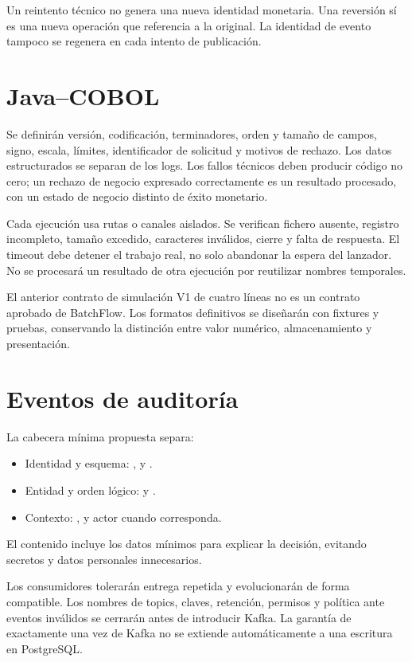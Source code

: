 Un reintento técnico no genera una nueva identidad monetaria. Una reversión sí es una nueva operación que referencia a la original. La identidad de evento tampoco se regenera en cada intento de publicación.

\section{Java--COBOL}
Se definirán versión, codificación, terminadores, orden y tamaño de campos, signo, escala, límites, identificador de solicitud y motivos de rechazo. Los datos estructurados se separan de los logs. Los fallos técnicos deben producir código no cero; un rechazo de negocio expresado correctamente es un resultado procesado, con un estado de negocio distinto de éxito monetario.

Cada ejecución usa rutas o canales aislados. Se verifican fichero ausente, registro incompleto, tamaño excedido, caracteres inválidos, cierre y falta de respuesta. El timeout debe detener el trabajo real, no solo abandonar la espera del lanzador. No se procesará un resultado de otra ejecución por reutilizar nombres temporales.

El anterior contrato de simulación V1 de cuatro líneas no es un contrato aprobado de BatchFlow. Los formatos definitivos se diseñarán con fixtures y pruebas, conservando la distinción entre valor numérico, almacenamiento y presentación.

\section{Eventos de auditoría}
La cabecera mínima propuesta separa:
\begin{itemize}
\item Identidad y esquema: ,  y .
\item Entidad y orden lógico:  y .
\item Contexto: ,  y actor cuando corresponda.
\end{itemize}
El contenido incluye los datos mínimos para explicar la decisión, evitando secretos y datos personales innecesarios.

Los consumidores tolerarán entrega repetida y evolucionarán de forma compatible. Los nombres de topics, claves, retención, permisos y política ante eventos inválidos se cerrarán antes de introducir Kafka. La garantía de exactamente una vez de Kafka no se extiende automáticamente a una escritura en PostgreSQL.

